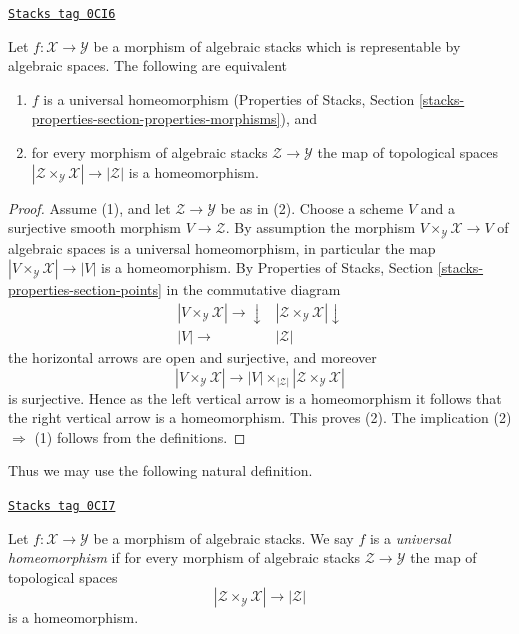\begin{lemma}
\label{stacks-morphisms-lemma-characterize-representable-universal-homeomorphism}
\href{https://stacks.math.columbia.edu/tag/0CI6}{\texttt{Stacks tag 0CI6}}

Let $f : \mathcal{X} \to \mathcal{Y}$ be a morphism of
algebraic stacks which is representable by algebraic spaces.
The following are equivalent
\begin{enumerate}
\item $f$ is a universal homeomorphism (Properties of Stacks,
Section \ref{stacks-properties-section-properties-morphisms}), and
\item for every morphism of algebraic stacks $\mathcal{Z} \to \mathcal{Y}$
the map of topological spaces
$|\mathcal{Z} \times_\mathcal{Y} \mathcal{X}| \to |\mathcal{Z}|$ is
a homeomorphism.
\end{enumerate}
\end{lemma}

\begin{proof}
Assume (1), and let $\mathcal{Z} \to \mathcal{Y}$ be as in (2).
Choose a scheme $V$ and a surjective smooth morphism $V \to \mathcal{Z}$.
By assumption the morphism $V \times_\mathcal{Y} \mathcal{X} \to V$
of algebraic spaces is a universal homeomorphism, in particular the map
$|V \times_\mathcal{Y} \mathcal{X}| \to |V|$ is a homeomorphism. By
Properties of Stacks, Section \ref{stacks-properties-section-points}
in the commutative diagram
$$
\begin{array}{cc}|V \times_\mathcal{Y} \mathcal{X}| \longrightarrow\downarrow & |\mathcal{Z} \times_\mathcal{Y} \mathcal{X}| \downarrow \\ |V| \longrightarrow & |\mathcal{Z}|\end{array}
$$
the horizontal arrows are open and surjective, and moreover
$$
|V \times_\mathcal{Y} \mathcal{X}| \longrightarrow
|V| \times_{|\mathcal{Z}|} |\mathcal{Z} \times_\mathcal{Y} \mathcal{X}|
$$
is surjective. Hence as the left vertical arrow is a homeomorphism
it follows that the right vertical arrow is a homeomorphism. This proves (2).
The implication (2) $\Rightarrow$ (1) follows from the definitions.
\end{proof}

Thus we may use the following natural definition.

\begin{definition}
\label{stacks-morphisms-definition-universal-homeomorphism}
\href{https://stacks.math.columbia.edu/tag/0CI7}{\texttt{Stacks tag 0CI7}}

Let $f : \mathcal{X} \to \mathcal{Y}$ be a morphism of algebraic stacks.
We say $f$ is a {\it universal homeomorphism} if for every morphism
of algebraic stacks $\mathcal{Z} \to \mathcal{Y}$
the map of topological spaces
$$
|\mathcal{Z} \times_\mathcal{Y} \mathcal{X}| \to |\mathcal{Z}|
$$
is a homeomorphism.
\end{definition}

